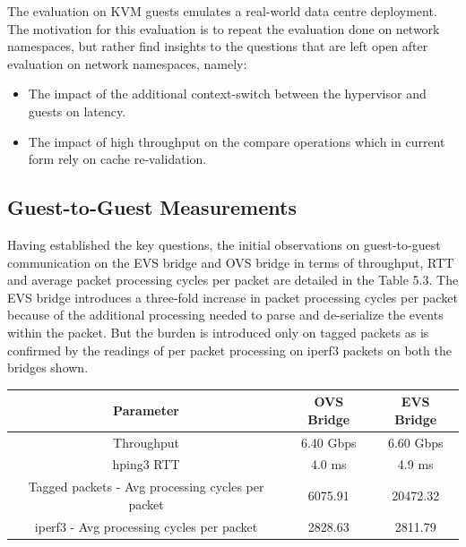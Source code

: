 The evaluation on KVM guests emulates a real-world data centre deployment. The motivation for this evaluation is to repeat the evaluation done on network namespaces, but rather find insights to the questions that are left open after evaluation on network namespaces, namely:
\begin{itemize}
	\item The impact of the additional context-switch between the hypervisor and guests on latency. 
	\item The impact of high throughput on the compare operations which in current form rely on cache re-validation. 
\end{itemize}

\subsection{Guest-to-Guest Measurements}

Having established the key questions, the initial observations on guest-to-guest communication on the EVS bridge and OVS bridge in terms of throughput, RTT and average packet processing cycles per packet are detailed in the Table 5.3. The EVS bridge introduces a three-fold increase in packet processing cycles per packet because of the additional processing needed to parse and de-serialize the events within the packet. But the burden is introduced only on tagged packets as is confirmed by the readings of per packet processing on iperf3 packets on both the bridges shown. \newline \newline



\begin{center}
	 \label{tab:title} 
	\begin{tabular}{ |c|c|c| }
		\hline
		\textbf{Parameter} &  \textbf{OVS Bridg}e &  \textbf{EVS Bridge} \\\toprule
		\hline
		Throughput  & 6.40 Gbps & 6.60 Gbps  \\
		\hline 
		hping3 RTT  & 4.0 ms & 4.9 ms \\
		\hline		
		Tagged packets - Avg processing 
		cycles per packet  &  6075.91 & 20472.32  \\ 
		\hline
		\hline		
		iperf3 - Avg processing 
		cycles per packet   &  2828.63 & 2811.79 \\\bottomrule		
	\end{tabular}
\end{center} 


